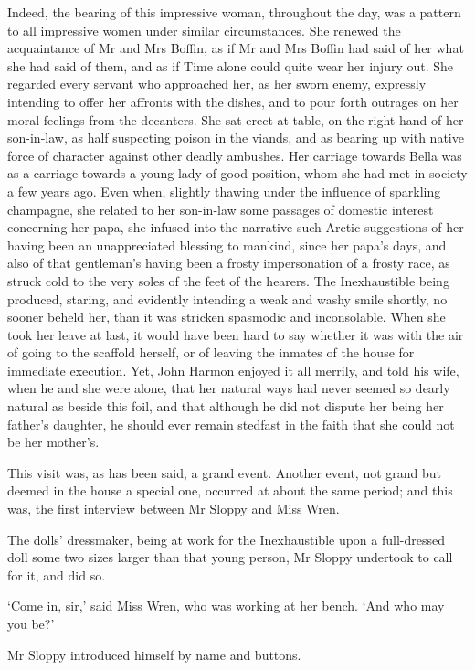 Indeed, the bearing of this impressive woman, throughout the day, was a
pattern to all impressive women under similar circumstances. She renewed
the acquaintance of Mr and Mrs Boffin, as if Mr and Mrs Boffin had said
of her what she had said of them, and as if Time alone could quite wear
her injury out. She regarded every servant who approached her, as her
sworn enemy, expressly intending to offer her affronts with the dishes,
and to pour forth outrages on her moral feelings from the decanters.
She sat erect at table, on the right hand of her son-in-law, as half
suspecting poison in the viands, and as bearing up with native force of
character against other deadly ambushes. Her carriage towards Bella was
as a carriage towards a young lady of good position, whom she had met in
society a few years ago. Even when, slightly thawing under the influence
of sparkling champagne, she related to her son-in-law some passages of
domestic interest concerning her papa, she infused into the narrative
such Arctic suggestions of her having been an unappreciated blessing to
mankind, since her papa’s days, and also of that gentleman’s having
been a frosty impersonation of a frosty race, as struck cold to the
very soles of the feet of the hearers. The Inexhaustible being produced,
staring, and evidently intending a weak and washy smile shortly, no
sooner beheld her, than it was stricken spasmodic and inconsolable. When
she took her leave at last, it would have been hard to say whether it
was with the air of going to the scaffold herself, or of leaving the
inmates of the house for immediate execution. Yet, John Harmon enjoyed
it all merrily, and told his wife, when he and she were alone, that her
natural ways had never seemed so dearly natural as beside this foil,
and that although he did not dispute her being her father’s daughter,
he should ever remain stedfast in the faith that she could not be her
mother’s.


This visit was, as has been said, a grand event. Another event, not
grand but deemed in the house a special one, occurred at about the same
period; and this was, the first interview between Mr Sloppy and Miss
Wren.

The dolls’ dressmaker, being at work for the Inexhaustible upon a
full-dressed doll some two sizes larger than that young person, Mr
Sloppy undertook to call for it, and did so.

‘Come in, sir,’ said Miss Wren, who was working at her bench. ‘And who
may you be?’

Mr Sloppy introduced himself by name and buttons.

